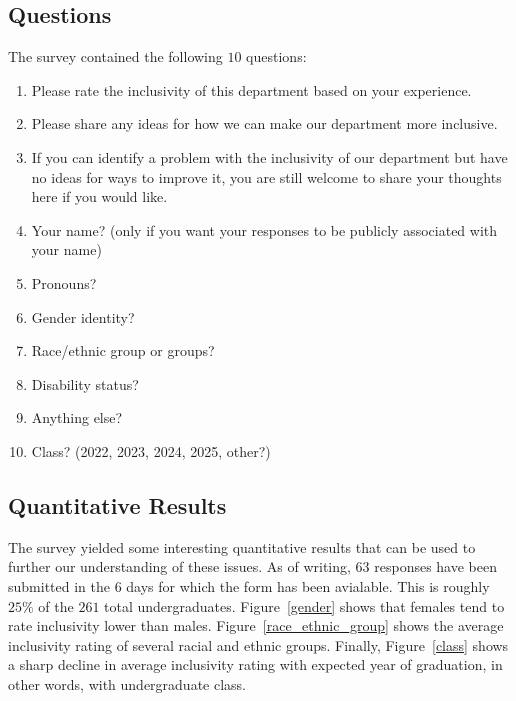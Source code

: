 \documentclass{article}
\begin{document}
\subsection{Questions}
The survey contained the following $10$ questions:
\begin{enumerate}
\item Please rate the inclusivity of this department based on your experience.	
\item Please share any ideas for how we can make our department more inclusive.	
\item If you can identify a problem with the inclusivity of our department but have no ideas for ways to improve it, you are still welcome to share your thoughts here if you would like.	
\item Your name? (only if you want your responses to be publicly associated with your name)	
\item Pronouns?	
\item Gender identity?	
\item Race/ethnic group or groups?	
\item Disability status?	
\item Anything else?	
\item Class? (2022, 2023, 2024, 2025, other?)
\end{enumerate}

\subsection{Quantitative Results}
The survey yielded some interesting quantitative results that can be 
used to further our understanding of these issues.
As of writing, $63$ responses have been submitted in the $6$ days for which the form
has been avialable.
This is roughly $25\%$ of the $261$ total undergraduates.
Figure~\ref{gender} shows that females tend to rate inclusivity lower than males.
Figure~\ref{race_ethnic_group} shows the average inclusivity rating of several racial 
and ethnic groups.
Finally, Figure~\ref{class} shows a sharp decline in average inclusivity rating with 
expected year of graduation, in other words, with undergraduate class.
\end{document}
